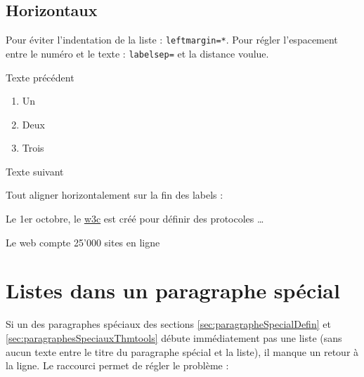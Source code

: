 \subsection{Horizontaux}

Pour éviter l'indentation de la liste : \texttt{leftmargin=*}. Pour régler l'espacement entre le numéro et le texte : \texttt{labelsep=} et la distance voulue.
\begin{LTXexample}[pos=o,width=.4]
Texte précédent
\begin{enumerate}[leftmargin=*, labelsep=1cm]
    \item Un
    \item Deux
    \item Trois
\end{enumerate}
Texte suivant
\end{LTXexample}


Tout aligner horizontalement sur la fin des labels :
\begin{LTXexample}[pos=o,width=.4]
\begin{description}[
    font=\normalfont,
    leftmargin=!,
    labelwidth=\widthof{2000 :}]
    \item[1994 :] Le 1er octobre, le \href{http://www.w3.org}{w3c} est créé pour définir des protocoles \dots
    \item[1995 :] Le web compte 25'000 sites en ligne
\end{description}
\end{LTXexample}





\section{Listes dans un paragraphe spécial}
\label{sec:listeParSpeciaux}

Si un des paragraphes spéciaux des sections \ref{sec:paragrapheSpecialDefin} et \ref{sec:paragraphesSpeciauxThmtools} débute immédiatement pas une liste (sans aucun texte entre le titre du paragraphe spécial et la liste), il manque un retour à la ligne. Le raccourci \texttt{\listtopsep} permet de régler le problème :

\begin{LTXexample}[pos=o,width=.4]
\end{LTXexample}





